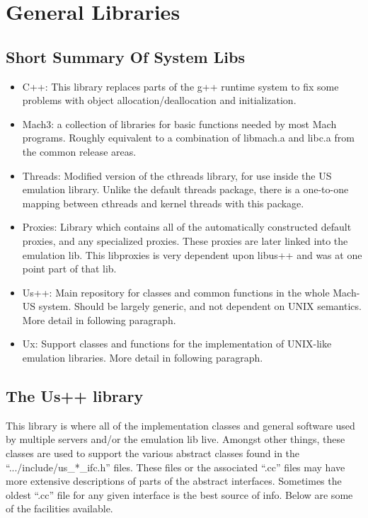 \section{General Libraries}
\subsection{Short Summary Of System Libs}
\begin{itemize}
\item{C++}: This library replaces parts of the g++ runtime system to
fix some problems with object allocation/deallocation and initialization.
\item{Mach3}:
a collection of libraries for basic functions needed by
most Mach programs. Roughly equivalent to a combination of
libmach.a and libc.a from the common release areas.
\item{Threads}:
Modified version of the cthreads library, for use
inside the US emulation library.  Unlike the default threads package, there
is a one-to-one mapping between cthreads and kernel threads with this package.
\item{Proxies}:  Library which contains all of the automatically constructed
default proxies, and any specialized proxies.  These proxies are later
linked into the emulation lib.  This libproxies is very dependent upon libus++
and was at one point part of that lib.
\item{Us++}:
Main repository for classes and common functions in the
whole Mach-US system. Should be largely generic, and not dependent
on UNIX semantics.  More detail in following paragraph.
\item{Ux}:
Support classes and functions for the implementation of
UNIX-like emulation libraries.  More detail in following paragraph.
\end{itemize}

\subsection{The Us++ library}
This library is where all of the implementation classes and general
software used by multiple servers and/or the emulation lib live.
Amongst other things, these classes are used to support the various
abstract classes found in the ``.../include/us\_*\_ifc.h'' files.
These files or the associated ``.cc'' files may have more extensive
descriptions of parts of the abstract interfaces.  Sometimes the oldest
``.cc'' file for any given interface is the best source of info.
Below are some of the facilities available.

